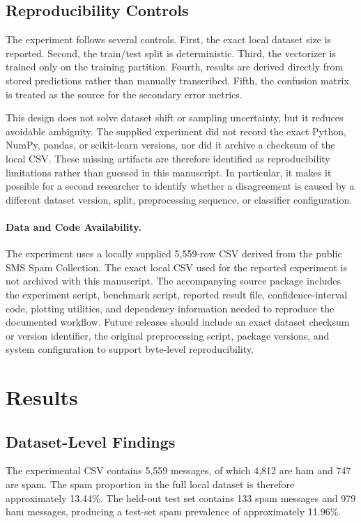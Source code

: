 \documentclass[conference]{IEEEtran}
\begin{document}
\subsection{Reproducibility Controls}
The experiment follows several controls. First, the exact local dataset size is reported. Second, the train/test split is deterministic. Third, the vectorizer is trained only on the training partition. Fourth, results are derived directly from stored predictions rather than manually transcribed. Fifth, the confusion matrix is treated as the source for the secondary error metrics.

This design does not solve dataset shift or sampling uncertainty, but it reduces avoidable ambiguity. The supplied experiment did not record the exact Python, NumPy, pandas, or scikit-learn versions, nor did it archive a checksum of the local CSV. These missing artifacts are therefore identified as reproducibility limitations rather than guessed in this manuscript. In particular, it makes it possible for a second researcher to identify whether a disagreement is caused by a different dataset version, split, preprocessing sequence, or classifier configuration.

\paragraph{Data and Code Availability.} The experiment uses a locally supplied 5,559-row CSV derived from the public SMS Spam Collection. The exact local CSV used for the reported experiment is not archived with this manuscript. The accompanying source package includes the experiment script, benchmark script, reported result file, confidence-interval code, plotting utilities, and dependency information needed to reproduce the documented workflow. Future releases should include an exact dataset checksum or version identifier, the original preprocessing script, package versions, and system configuration to support byte-level reproducibility.

\section{Results}
\subsection{Dataset-Level Findings}
The experimental CSV contains 5,559 messages, of which 4,812 are ham and 747 are spam. The spam proportion in the full local dataset is therefore approximately 13.44\%. The held-out test set contains 133 spam messages and 979 ham messages, producing a test-set spam prevalence of approximately 11.96\%.
\end{document}
